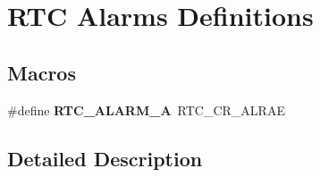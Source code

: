 \hypertarget{group___r_t_c___alarms___definitions}{}\section{R\+TC Alarms Definitions}
\label{group___r_t_c___alarms___definitions}
\subsection*{Macros}
\begin{DoxyCompactItemize}
\item 
\mbox{\label{group___r_t_c___alarms___definitions_ga916bcb75517157e284344f96ac275639}} 
\#define {\bfseries R\+T\+C\+\_\+\+A\+L\+A\+R\+M\+\_\+A}~R\+T\+C\+\_\+\+C\+R\+\_\+\+A\+L\+R\+AE
\end{DoxyCompactItemize}


\subsection{Detailed Description}
